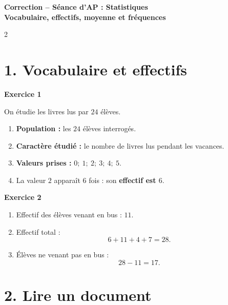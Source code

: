 \documentclass[11pt,a4paper,landscape]{article}
\newcommand{\soustitreexo}[1]{%
  {\sffamily\bfseries\color{TitreC}#1}\par
  \vspace{0.04em}
}
\begin{document}
\begin{center}
  {\sffamily\LARGE\bfseries\color{TitreC}
  Correction -- Séance d'AP : Statistiques}\\[-0.05em]

  {\sffamily\normalsize\bfseries\color{SavoirC}
  Vocabulaire, effectifs, moyenne et fréquences}
\end{center}

\vspace{-0.45em}

\begin{multicols*}{2}

\section*{1. Vocabulaire et effectifs}

\soustitreexo{Exercice 1}

On étudie les livres lus par \(24\) élèves.

\begin{enumerate}[label=\alph*)]
  \item \textbf{Population :} les \(24\) élèves interrogés.
  \item \textbf{Caractère étudié :} le nombre de livres lus pendant les vacances.
  \item \textbf{Valeurs prises :} \(0;\ 1;\ 2;\ 3;\ 4;\ 5\).
  \item La valeur \(2\) apparaît \(6\) fois : son \textbf{effectif est \(6\)}.
\end{enumerate}

\soustitreexo{Exercice 2}

\begin{enumerate}[label=\alph*)]
  \item Effectif des élèves venant en bus : \(\boxed{11}\).
  \item Effectif total :
  \[
  6+11+4+7=\boxed{28}.
  \]
  \item Élèves ne venant pas en bus :
  \[
  28-11=\boxed{17}.
  \]
\end{enumerate}

\section*{2. Lire un document}


\end{multicols*}
\end{document}
